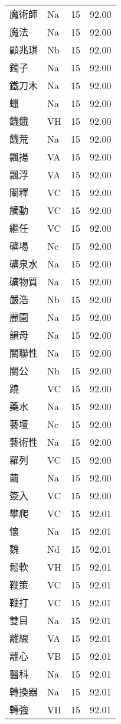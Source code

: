 \documentclass[twocolumn]{book}
\begin{document}
\begin{supertabular}{llrr}
魔術師 & Na & 15 &  92.00\\
魔法 & Na & 15 &  92.00\\
顧兆琪 & Nb & 15 &  92.00\\
鐲子 & Na & 15 &  92.00\\
鐵刀木 & Na & 15 &  92.00\\
蠟 & Na & 15 &  92.00\\
饑餓 & VH & 15 &  92.00\\
饑荒 & Na & 15 &  92.00\\
飄揚 & VA & 15 &  92.00\\
飄浮 & VA & 15 &  92.00\\
闡釋 & VC & 15 &  92.00\\
觸動 & VC & 15 &  92.00\\
繼任 & VC & 15 &  92.00\\
礦場 & Nc & 15 &  92.00\\
礦泉水 & Na & 15 &  92.00\\
礦物質 & Na & 15 &  92.00\\
嚴浩 & Nb & 15 &  92.00\\
麗園 & Na & 15 &  92.00\\
韻母 & Na & 15 &  92.00\\
關聯性 & Na & 15 &  92.00\\
關公 & Nb & 15 &  92.00\\
蹺 & VC & 15 &  92.00\\
藥水 & Na & 15 &  92.00\\
藝壇 & Nc & 15 &  92.00\\
藝術性 & Na & 15 &  92.00\\
羅列 & VC & 15 &  92.00\\
繭 & Na & 15 &  92.00\\
簽入 & VC & 15 &  92.00\\
攀爬 & VC & 15 &  92.01\\
懷 & Na & 15 &  92.01\\
魏 & Nd & 15 &  92.01\\
鬆軟 & VH & 15 &  92.01\\
鞭策 & VC & 15 &  92.01\\
鞭打 & VC & 15 &  92.01\\
雙目 & Na & 15 &  92.01\\
離線 & VA & 15 &  92.01\\
離心 & VB & 15 &  92.01\\
醫科 & Na & 15 &  92.01\\
轉換器 & Na & 15 &  92.01\\
轉強 & VH & 15 &  92.01\\

\end{supertabular}
\end{document}
